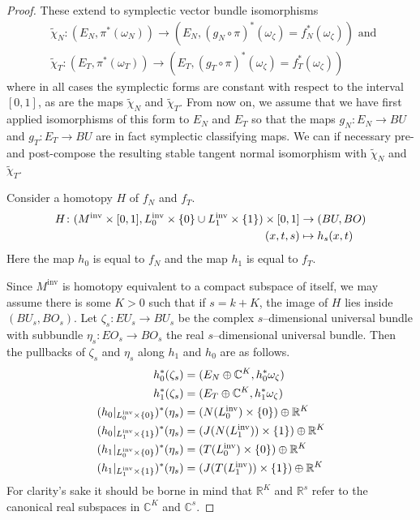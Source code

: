 \documentclass[11pt]{amsart}
\theoremstyle{definition}
\theoremstyle{remark}
\def\C{\mathbb{C}}
\def\co{\colon }
\newcommand{\M}{M^{\operatorname{inv}}}
\newcommand{\Lo}{L_0^{\operatorname{inv}}}
\newcommand{\Li}{L_1^{\operatorname{inv}}}
\numberwithin{equation}{section}
\begin{document}
\begin{proof}
These extend to symplectic
vector bundle isomorphisms
\begin{align*}&\widetilde{\chi}_N\co (E_N,
\pi^*(\omega_N)) \rightarrow (E_N,
(g_N\circ \pi)^*(\omega_{\zeta})= f_N^*(\omega_\zeta) )\textrm{ and }\\&\widetilde{\chi}_T\co (E_T, \pi^*(\omega_T)) \rightarrow (E_T,(g_T\circ \pi)^*(\omega_{\zeta})= f_T^*(\omega_\zeta))\end{align*}
where in all cases the
symplectic forms are constant with respect to the interval $[0,1]$, as are the maps
$\widetilde{\chi}_N$ and $\widetilde{\chi}_T$. From now on, we assume that we have first applied 
isomorphisms of this form to $E_N$ and $E_T$ so that the maps
$g_N \co E_N \rightarrow BU$ and $g_T\co E_T\rightarrow BU$ are in fact symplectic
classifying maps. We can if necessary pre- and post-compose the resulting stable
tangent normal isomorphism with $\widetilde{\chi}_N$ and $\widetilde{\chi}_T$.



Consider a homotopy $H$ of $f_N$ and $f_T$.
%
\begin{align*}
H \co (\M \times [0,1], \smash{\Lo} \times \{0\} \cup \smash{\Li} \times \{1\}) \times [0,1] &\rightarrow (BU,BO) \\
(x,t,s) &\mapsto h_s(x,t)
\end{align*}
%
Here the map $h_0$ is equal to $f_N$ and the map $h_1$ is equal to $f_T$.


Since $\M$ is homotopy equivalent to a compact subspace of itself, we may assume there is some $K>0$ such that if $s=k +K$, the image of $H$ lies inside $(BU_s, BO_s)$. Let $\zeta_s \co EU_s \rightarrow BU_s$ be the complex $s$--dimensional universal bundle with subbundle $\eta_s \co EO_s \rightarrow BO_s$ the real $s$--dimensional universal bundle. Then the pullbacks of $\zeta_s$ and $\eta_s$ along $h_1$ and $h_0$ are as follows.
%
\begin{align*}
h_0^*(\zeta_s) &= (E_N \oplus \mathbb C^K, h_0^*\omega_{\zeta}) \\
h_1^*(\zeta_s) &= (E_T\oplus \C^K, h_1^*\omega_{\zeta}) \\
(h_0|_{\smash{\Lo}\times \{0\}})^*(\eta_s) &= (N(\smash{\Lo}) \times \{0\}) \oplus \mathbb R^K \\
(h_0|_{\smash{\Li} \times \{1\}})^*(\eta_s) &= (J(N(\smash{\Li})) \times \{1\}) \oplus \mathbb R^K \\
(h_1|_{\smash{\Lo}\times \{0\}})^*(\eta_s) &= (T(\smash{\Lo}) \times \{0\}) \oplus \mathbb R^K \\
(h_1|_{\smash{\Li} \times \{1\}})^*(\eta_s) &= (J(T(\smash{\Li})) \times \{1\}) \oplus \mathbb R^K \\
\end{align*}
For clarity's sake it should be borne in mind that $\mathbb R^K$ and $\mathbb R^s$ refer to the canonical real subspaces in $\mathbb C^K$ and $\mathbb C^s$.




\end{proof}
\end{document}
